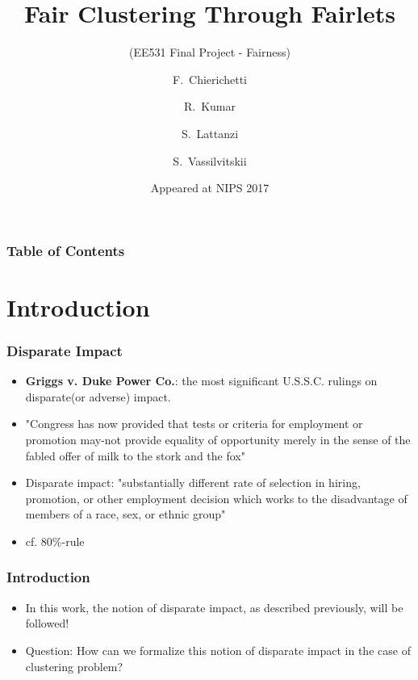 \documentclass{beamer}
\title[Fair Clustering Through Fairlets]
{Fair Clustering Through Fairlets}
\subtitle{(EE531 Final Project - Fairness)}
\author[Junghyun Lee]
{F.~Chierichetti\inst{1} \and R.~Kumar\inst{2} \and S.~Lattanzi\inst{2} \and S.~Vassilvitskii\inst{2}}
\institute[KAIST]
{
	\inst{1}%
	Dipartimento di Informatica,
	Sapienza University
	
	\inst{2}%
	Google Research
}
\date[NIPS 2017]
{Appeared at NIPS 2017}
\begin{document}
\frame{\titlepage}


\begin{frame}
\frametitle{Table of Contents}
\tableofcontents
\end{frame}

\section{Introduction}

\begin{frame}
\frametitle{Disparate Impact}

\begin{itemize}
    \item {\bf Griggs v. Duke Power Co.}: the most significant U.S.S.C. rulings on disparate(or adverse) impact. \pause
    
    \item "Congress has now provided that tests or criteria for employment or promotion may-not provide equality of opportunity merely in the sense of the fabled offer of milk to the stork and the fox" \pause
    
    \item \alert{Disparate impact}: "substantially different rate of selection in hiring, promotion, or other employment decision which works to the disadvantage of members of a race, sex, or ethnic group" \pause
    
    \item cf. $80\%$-rule
\end{itemize}
\end{frame}

\begin{frame}
\frametitle{Introduction}

\begin{itemize}
    \item In this work, the notion of \alert{disparate impact}, as described previously, will be followed! \pause
    
    \item Question: How can we formalize this notion of disparate impact in the case of clustering problem?
\end{itemize}
\end{frame}
\end{document}
